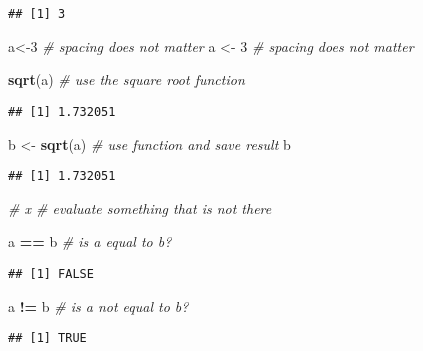 \documentclass[
]{article}
\newenvironment{Shaded}{\begin{snugshade}}{\end{snugshade}}
\newcommand{\CommentTok}[1]{\textcolor[rgb]{0.56,0.35,0.01}{\textit{#1}}}
\newcommand{\DecValTok}[1]{\textcolor[rgb]{0.00,0.00,0.81}{#1}}
\newcommand{\KeywordTok}[1]{\textcolor[rgb]{0.13,0.29,0.53}{\textbf{#1}}}
\newcommand{\NormalTok}[1]{#1}
\newcommand{\OperatorTok}[1]{\textcolor[rgb]{0.81,0.36,0.00}{\textbf{#1}}}
\newcommand{\StringTok}[1]{\textcolor[rgb]{0.31,0.60,0.02}{#1}}
\begin{document}
\begin{verbatim}
## [1] 3
\end{verbatim}

\begin{Shaded}
\begin{Highlighting}[]
\NormalTok{a<-}\DecValTok{3}        \CommentTok{# spacing does not matter}
\NormalTok{a    <-}\StringTok{    }\DecValTok{3}        \CommentTok{# spacing does not matter}

\KeywordTok{sqrt}\NormalTok{(a)         }\CommentTok{# use the square root function}
\end{Highlighting}
\end{Shaded}

\begin{verbatim}
## [1] 1.732051
\end{verbatim}

\begin{Shaded}
\begin{Highlighting}[]
\NormalTok{b <-}\StringTok{ }\KeywordTok{sqrt}\NormalTok{(a)        }\CommentTok{# use function and save result}
\NormalTok{b}
\end{Highlighting}
\end{Shaded}

\begin{verbatim}
## [1] 1.732051
\end{verbatim}

\begin{Shaded}
\begin{Highlighting}[]
\CommentTok{# x             # evaluate something that is not there}

\NormalTok{a }\OperatorTok{==}\StringTok{ }\NormalTok{b          }\CommentTok{# is a equal to b?         }
\end{Highlighting}
\end{Shaded}

\begin{verbatim}
## [1] FALSE
\end{verbatim}

\begin{Shaded}
\begin{Highlighting}[]
\NormalTok{a }\OperatorTok{!=}\StringTok{ }\NormalTok{b          }\CommentTok{# is a not equal to b?}
\end{Highlighting}
\end{Shaded}

\begin{verbatim}
## [1] TRUE
\end{verbatim}
\end{document}
